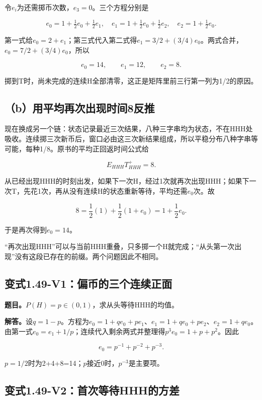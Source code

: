 \documentclass[
  11pt,
  a4paper,
  UTF8,
  fontset=fandol]{ctexart}
\begin{document}
令\(e_i\)为还需掷币次数，\(e_3=0\)。三个方程分别是

\[
e_0=1+\tfrac12e_0+\tfrac12e_1,\quad
 e_1=1+\tfrac12e_0+\tfrac12e_2,\quad
 e_2=1+\tfrac12e_0.
\]

第一式给\(e_0=2+e_1\)；第三式代入第二式得\(e_1=3/2+(3/4)e_0\)。两式合并，\(e_0=7/2+(3/4)e_0\)，所以

\[
\boxed{e_0=14,\qquad e_1=12,\qquad e_2=8.}
\]

掷到T时，尚未完成的连续H全部清零，这正是矩阵里前三行第一列为1/2的原因。

\subsection{（b）用平均再次出现时间8反推}\label{bux7528ux5e73ux5747ux518dux6b21ux51faux73b0ux65f6ux95f48ux53cdux63a8}

现在换成另一个链：状态记录最近三次结果，八种三字串均为状态，不在HHH处吸收。连续掷三次新币后，窗口必由这三次新结果组成，所以平稳分布八种字串等可能，每种1/8。原书的平均正回返时间公式给

\[
E_{HHH}T_{HHH}^{+}=8.
\]

从已经出现HHH的时刻出发，如果下一次H，经过1次就再次出现HHH；如果下一次T，先花1次，再从没有连续H的状态重新等待，平均还需\(e_0\)次。故

\[
8=\frac12(1)+\frac12(1+e_0)=1+\frac12e_0.
\]

于是再次得到\(\boxed{e_0=14}\)。

``再次出现HHH''可以与当前HHH重叠，只多掷一个H就完成；``从头第一次出现''没有这段已存在的前缀。两个问题因此不相同。

\subsection{变式1.49-V1：偏币的三个连续正面}\label{ux53d8ux5f0f1.49-v1ux504fux5e01ux7684ux4e09ux4e2aux8fdeux7eedux6b63ux9762}

\textbf{题目。}\(P(H)=p\in(0,1)\)，求从头等待HHH的均值。

\textbf{解答。}设\(q=1-p\)。方程为\(e_0=1+qe_0+pe_1\)、\(e_1=1+qe_0+pe_2\)、\(e_2=1+qe_0\)。由第一式\(e_0=e_1+1/p\)；连续代入剩余两式并整理得\(p^3e_0=1+p+p^2\)。因此

\[
\boxed{e_0=p^{-1}+p^{-2}+p^{-3}.}
\]

\(p=1/2\)时为2+4+8=14；\(p\)接近0时，\(p^{-3}\)是主要项。

\subsection{变式1.49-V2：首次等待HHH的方差}\label{ux53d8ux5f0f1.49-v2ux9996ux6b21ux7b49ux5f85hhhux7684ux65b9ux5dee}
\end{document}
